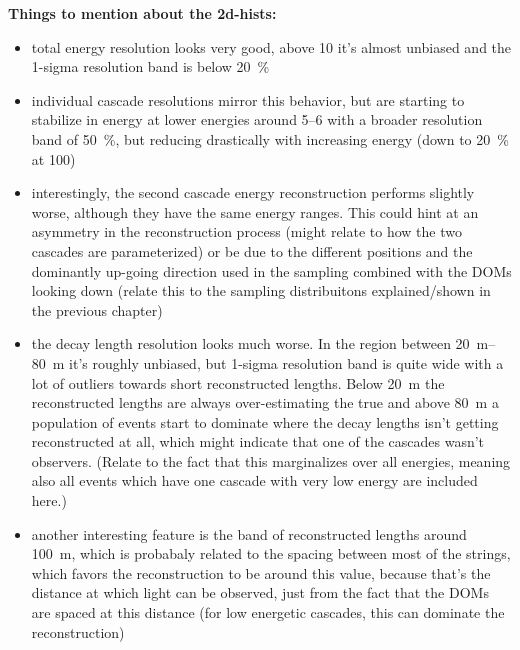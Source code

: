 \textbf{Things to mention about the 2d-hists:}
\begin{itemize}
    \item total energy resolution looks very good, above \SI{10}{\gev} it's almost unbiased and the 1-sigma resolution band is below \SI{20}{\percent}
    \item individual cascade resolutions mirror this behavior, but are starting to stabilize in energy at lower energies around \SIrange{5}{6}{\gev} with a broader resolution band of \SI{50}{\percent}, but reducing drastically with increasing energy (down to \SI{20}{\percent} at \SI{100}{\gev})
    \item interestingly, the second cascade energy reconstruction performs slightly worse, although they have the same energy ranges. This could hint at an asymmetry in the reconstruction process (might relate to how the two cascades are parameterized) or be due to the different positions and the dominantly up-going direction used in the sampling combined with the DOMs looking down (relate this to the sampling distribuitons explained/shown in the previous chapter)
    \item the decay length resolution looks much worse. In the region between \SIrange[range-phrase={~and~}]{20}{80}{\meter} it's roughly unbiased, but 1-sigma resolution band is quite wide with a lot of outliers towards short reconstructed lengths. Below \SI{20}{\meter} the reconstructed lengths are always over-estimating the true and above \SI{80}{\meter} a population of events start to dominate where the decay lengths isn't getting reconstructed at all, which might indicate that one of the cascades wasn't observers. (Relate to the fact that this marginalizes over all energies, meaning also all events which have one cascade with very low energy are included here.)
    \item another interesting feature is the band of reconstructed lengths around \SI{100}{\meter}, which is probabaly related to the spacing between most of the strings, which favors the reconstruction to be around this value, because that's the distance at which light can be observed, just from the fact that the DOMs are spaced at this distance (for low energetic cascades, this can dominate the reconstruction)
\end{itemize}



